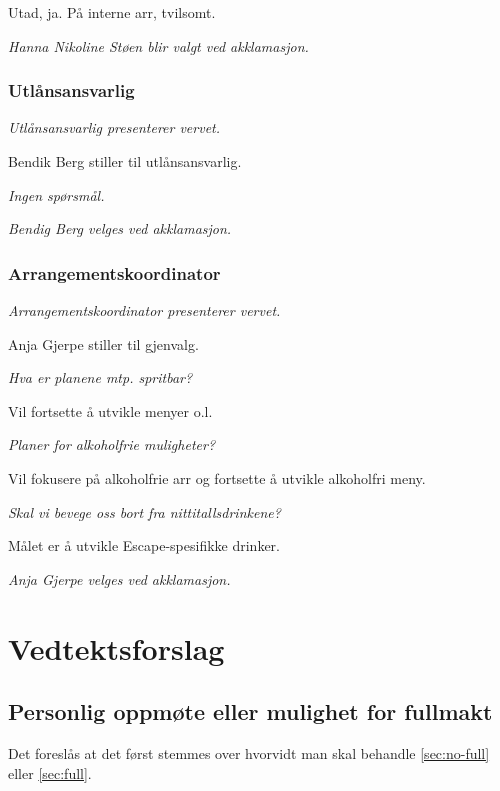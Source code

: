\documentclass[10pt,norsk,a4paper]{article}
\begin{document}
\begin{minipage}[t]{0.49\textwidth}
Utad, ja. På interne arr, tvilsomt.

\textit{Hanna Nikoline Støen blir valgt ved akklamasjon.}
\subsubsection{Utlånsansvarlig}
\textit{Utlånsansvarlig presenterer vervet.}

Bendik Berg stiller til utlånsansvarlig.

\emph{Ingen spørsmål.}

\textit{Bendig Berg velges ved akklamasjon.}
\subsubsection{Arrangementskoordinator}
\textit{Arrangementskoordinator presenterer vervet.}

Anja Gjerpe stiller til gjenvalg.

\emph{Hva er planene mtp. spritbar?}

Vil fortsette å utvikle menyer o.l.

\emph{Planer for alkoholfrie muligheter?}

Vil fokusere på alkoholfrie arr og fortsette å utvikle alkoholfri meny.

\emph{Skal vi bevege oss bort fra nittitallsdrinkene?}

Målet er å utvikle Escape-spesifikke drinker.

\textit{Anja Gjerpe velges ved akklamasjon.}

\end{minipage}

\newpage

\section{Vedtektsforslag}

\subsection{Personlig oppmøte eller mulighet for fullmakt}

Det foreslås at det først stemmes over hvorvidt man skal behandle \cref{sec:no-full} eller \cref{sec:full}. 
\end{document}
